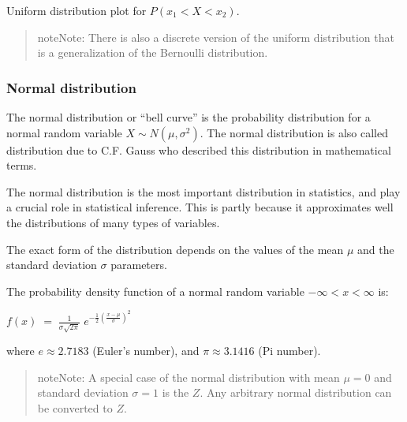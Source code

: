 \documentclass[a4paper,12pt,english]{sphinxhowto}
\begin{document}
Uniform distribution plot for \(P(x_1 < X < x_2)\).

\begin{quote}

\begin{sphinxadmonition}{note}{Note:}
There is also a discrete version of the uniform distribution
that is a generalization of the Bernoulli distribution.
\end{sphinxadmonition}
\end{quote}



\subsubsection{Normal distribution}
\label{\detokenize{Uncertainty:normal-distribution}}
The normal distribution \textendash{}or “bell curve”\textendash{} is the probability distribution for a normal
random variable \(X \sim N (\mu,\sigma^2)\).
The normal distribution is also called  distribution due to C.F. Gauss who described
this distribution in mathematical terms.

The normal distribution is the most important distribution in statistics, and
play a crucial role in statistical inference.
This is partly because it approximates well the distributions of many types of variables.

The exact form of the distribution depends on the values of the mean \(\mu\) and
the standard deviation \(\sigma\) parameters.

The probability density function of a normal random variable \(-\infty < x < \infty\) is:

\(f(x) \;=\; \frac{1}{{\sigma \sqrt {2\pi } }}\;e^{{{ - \frac12 \left( \frac{x - \mu }{\sigma} \right)^2 }  }}\)

where \(e \approx 2.7183\) (Euler’s number), and \(\pi \approx 3.1416\) (Pi number).
\begin{quote}

\begin{sphinxadmonition}{note}{Note:}
A special case of the normal distribution with mean \(\mu = 0\) and
standard deviation \(\sigma = 1\) is the  \(Z\).
Any arbitrary normal distribution can be converted to \(Z\).
\end{sphinxadmonition}
\end{quote}
\end{document}
